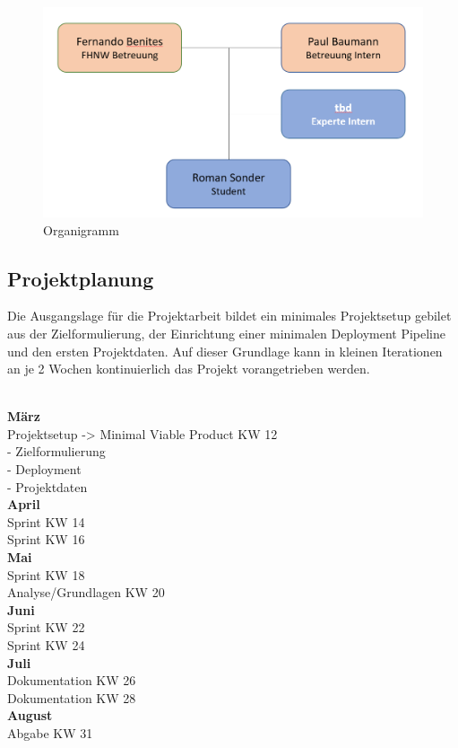 \documentclass[10pt,a4paper,oneside]{99_fhnwreport}
\begin{document}
\begin{figure}[htb]
\includegraphics[width=\textwidth]{0_Organigramm.png}
\caption{Organigramm} %
\label{fig:organigramm}
\end{figure}

\subsection{Projektplanung}

Die Ausgangslage für die Projektarbeit bildet ein minimales Projektsetup gebilet aus der Zielformulierung, der Einrichtung einer minimalen Deployment Pipeline und den ersten Projektdaten. Auf dieser Grundlage kann in kleinen Iterationen an je 2 Wochen kontinuierlich das Projekt vorangetrieben werden.

\begin{tabbing}
\hspace{80mm}		\= 	\\ %
\textbf{März} \> 	\\
Projektsetup -> Minimal Viable Product	\>	KW 12 \\
- Zielformulierung \>	 \\
- Deployment	\>	 \\
- Projektdaten	\>	 \\
\textbf{April} \> 	\\
Sprint		\>	KW 14 \\
Sprint		\>	KW 16 \\
\textbf{Mai} \> 	\\
Sprint		\>	KW 18 \\
Analyse/Grundlagen		\>	KW 20 \\
\textbf{Juni} \> 	\\
Sprint		\>	KW 22 \\
Sprint		\>	KW 24 \\
\textbf{Juli} \> 	\\
Dokumentation		\>	KW 26 \\
Dokumentation		\>	KW 28 \\
\textbf{August} \> 	\\
Abgabe		\>	KW 31 \\

\end{tabbing}
\newpage
\end{document}
